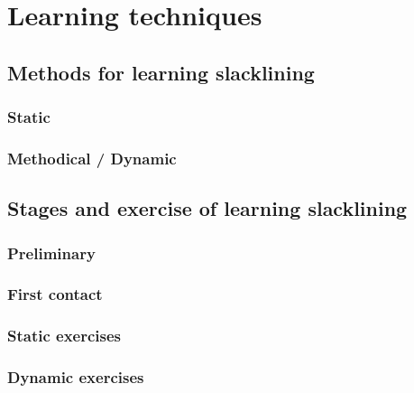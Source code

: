\section{Learning techniques}\label{3_2_learningTechniques}

\subsection{Methods for learning slacklining}
\subsubsection{Static}
\subsubsection{Methodical / Dynamic}

\subsection{Stages and exercise of learning slacklining}\label{3_2_2_StagesExercises}
\subsubsection{Preliminary}
\subsubsection{First contact}
\subsubsection{Static exercises}
\subsubsection{Dynamic exercises}